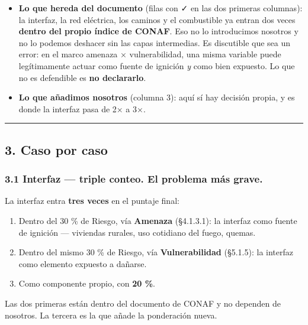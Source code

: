 \documentclass[
  spanish,
  10pt,
]{article}
\providecommand{\tightlist}{%
  \setlength{\itemsep}{0pt}\setlength{\parskip}{0pt}}
\begin{document}
\begin{itemize}
\tightlist
\item
  \textbf{Lo que hereda del documento} (filas con ✓ en las dos primeras
  columnas): la interfaz, la red eléctrica, los caminos y el combustible
  ya entran dos veces \textbf{dentro del propio índice de CONAF}. Eso no
  lo introducimos nosotros y no lo podemos deshacer sin las capas
  intermedias. Es discutible que sea un error: en el marco amenaza ×
  vulnerabilidad, una misma variable puede legítimamente actuar como
  fuente de ignición \emph{y} como bien expuesto. Lo que no es
  defendible es \textbf{no declararlo}.
\item
  \textbf{Lo que añadimos nosotros} (columna 3): aquí sí hay decisión
  propia, y es donde la interfaz pasa de 2× a 3×.
\end{itemize}

\begin{center}\rule{0.5\linewidth}{0.5pt}\end{center}

\subsection{3. Caso por caso}\label{caso-por-caso}

\subsubsection{\texorpdfstring{3.1 Interfaz --- triple conteo.
\textbf{El problema más
grave.}}{3.1 Interfaz --- triple conteo. El problema más grave.}}\label{interfaz-triple-conteo.-el-problema-muxe1s-grave.}

La interfaz entra \textbf{tres veces} en el puntaje final:

\begin{enumerate}
\def\labelenumi{\arabic{enumi}.}
\tightlist
\item
  Dentro del 30 \% de Riesgo, vía \textbf{Amenaza} (§4.1.3.1): la
  interfaz como fuente de ignición --- viviendas rurales, uso cotidiano
  del fuego, quemas.
\item
  Dentro del mismo 30 \% de Riesgo, vía \textbf{Vulnerabilidad}
  (§5.1.5): la interfaz como elemento expuesto a dañarse.
\item
  Como componente propio, con \textbf{20 \%}.
\end{enumerate}

Las dos primeras están dentro del documento de CONAF y no dependen de
nosotros. La tercera es la que añade la ponderación nueva.
\end{document}
